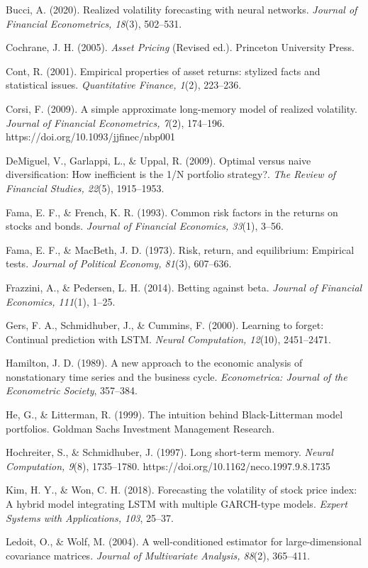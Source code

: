 \documentclass{article}
\begin{document}
Bucci, A. (2020). Realized volatility forecasting with neural networks. \textit{Journal of Financial Econometrics, 18}(3), 502–531.

Cochrane, J. H. (2005). \textit{Asset Pricing} (Revised ed.). Princeton University Press.

Cont, R. (2001). Empirical properties of asset returns: stylized facts and statistical issues. \textit{Quantitative Finance, 1}(2), 223–236.

Corsi, F. (2009). A simple approximate long-memory model of realized volatility. \textit{Journal of Financial Econometrics, 7}(2), 174–196. https://doi.org/10.1093/jjfinec/nbp001

DeMiguel, V., Garlappi, L., & Uppal, R. (2009). Optimal versus naive diversification: How inefficient is the 1/N portfolio strategy?. \textit{The Review of Financial Studies, 22}(5), 1915–1953.

Fama, E. F., & French, K. R. (1993). Common risk factors in the returns on stocks and bonds. \textit{Journal of Financial Economics, 33}(1), 3–56.

Fama, E. F., & MacBeth, J. D. (1973). Risk, return, and equilibrium: Empirical tests. \textit{Journal of Political Economy, 81}(3), 607–636.

Frazzini, A., & Pedersen, L. H. (2014). Betting against beta. \textit{Journal of Financial Economics, 111}(1), 1–25.

Gers, F. A., Schmidhuber, J., & Cummins, F. (2000). Learning to forget: Continual prediction with LSTM. \textit{Neural Computation, 12}(10), 2451–2471.

Hamilton, J. D. (1989). A new approach to the economic analysis of nonstationary time series and the business cycle. \textit{Econometrica: Journal of the Econometric Society}, 357–384.

He, G., & Litterman, R. (1999). The intuition behind Black-Litterman model portfolios. Goldman Sachs Investment Management Research.

Hochreiter, S., & Schmidhuber, J. (1997). Long short-term memory. \textit{Neural Computation, 9}(8), 1735–1780. https://doi.org/10.1162/neco.1997.9.8.1735

Kim, H. Y., & Won, C. H. (2018). Forecasting the volatility of stock price index: A hybrid model integrating LSTM with multiple GARCH-type models. \textit{Expert Systems with Applications, 103}, 25–37.

Ledoit, O., & Wolf, M. (2004). A well-conditioned estimator for large-dimensional covariance matrices. \textit{Journal of Multivariate Analysis, 88}(2), 365–411.
\end{document}
